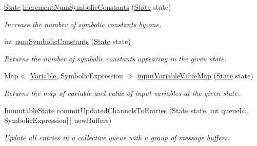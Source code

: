 \begin{DoxyCompactItemize}
\item 
\hyperlink{interfaceedu_1_1udel_1_1cis_1_1vsl_1_1civl_1_1state_1_1IF_1_1State}{State} \hyperlink{classedu_1_1udel_1_1cis_1_1vsl_1_1civl_1_1state_1_1common_1_1immutable_1_1ImmutableStateFactory_a61437ae4ca0fb099c9f79ddceaa5d07c}{increment\+Num\+Symbolic\+Constants} (\hyperlink{interfaceedu_1_1udel_1_1cis_1_1vsl_1_1civl_1_1state_1_1IF_1_1State}{State} state)
\begin{DoxyCompactList}\small\item\em Increase the number of symbolic constants by one. \end{DoxyCompactList}\item 
int \hyperlink{classedu_1_1udel_1_1cis_1_1vsl_1_1civl_1_1state_1_1common_1_1immutable_1_1ImmutableStateFactory_a10e26f9469590145532c69c4ce08fcb1}{num\+Symbolic\+Constants} (\hyperlink{interfaceedu_1_1udel_1_1cis_1_1vsl_1_1civl_1_1state_1_1IF_1_1State}{State} state)
\begin{DoxyCompactList}\small\item\em Returns the number of symbolic constants appearing in the given state. \end{DoxyCompactList}\item 
Map$<$ \hyperlink{interfaceedu_1_1udel_1_1cis_1_1vsl_1_1civl_1_1model_1_1IF_1_1variable_1_1Variable}{Variable}, Symbolic\+Expression $>$ \hyperlink{classedu_1_1udel_1_1cis_1_1vsl_1_1civl_1_1state_1_1common_1_1immutable_1_1ImmutableStateFactory_aa4bd3853959303e304debbc2ae22f5a4}{input\+Variable\+Value\+Map} (\hyperlink{interfaceedu_1_1udel_1_1cis_1_1vsl_1_1civl_1_1state_1_1IF_1_1State}{State} state)
\begin{DoxyCompactList}\small\item\em Returns the map of variable and value of input variables at the given state. \end{DoxyCompactList}\item 
\hyperlink{classedu_1_1udel_1_1cis_1_1vsl_1_1civl_1_1state_1_1common_1_1immutable_1_1ImmutableState}{Immutable\+State} \hyperlink{classedu_1_1udel_1_1cis_1_1vsl_1_1civl_1_1state_1_1common_1_1immutable_1_1ImmutableStateFactory_a948646856ef1cd713a740aecc22d34c0}{commit\+Updated\+Channels\+To\+Entries} (\hyperlink{interfaceedu_1_1udel_1_1cis_1_1vsl_1_1civl_1_1state_1_1IF_1_1State}{State} state, int queue\+Id, Symbolic\+Expression\mbox{[}$\,$\mbox{]} new\+Buffers)
\begin{DoxyCompactList}\small\item\em Update all entries in a collective queue with a group of message buffers. \end{DoxyCompactList}\item 

\end{DoxyCompactItemize}

